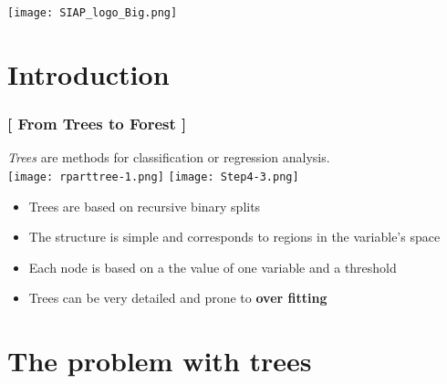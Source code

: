 \documentclass[xcolor=x11names,compress, handhouts]{beamer}
\renewcommand{\(}{\begin{columns}}
\renewcommand{\)}{\end{columns}}
\newcommand{\<}[1]{\begin{column}{#1}}
\renewcommand{\>}{\end{column}}
\begin{document}
\begin{frame}
\Large{ \color{siap}{Machine Learning for Official Statistics \& SDGs}}

\hspace{1cm}


\hspace{2cm}
\begin{center}

\texttt{[image: SIAP\_logo\_Big.png]}

\end{center}
\end{frame}



\section{Introduction}


\begin{frame} %
\frametitle{\textcolor{brique}{[  From Trees to Forest  ]}}
\textit{Trees} are methods for classification or regression analysis.\\
 \texttt{[image: rparttree-1.png]} \texttt{[image: Step4-3.png]}
\pause
\begin{itemize}[<+->]
  \item Trees are based on  recursive binary splits
  \item The structure is simple and corresponds to regions in the variable's space
  \item Each node is based on a the value of one variable  and a threshold
  \item Trees can be very detailed and prone to \textbf{over fitting}
\end{itemize}
\end{frame}


\section{The problem with trees}
\end{document}
